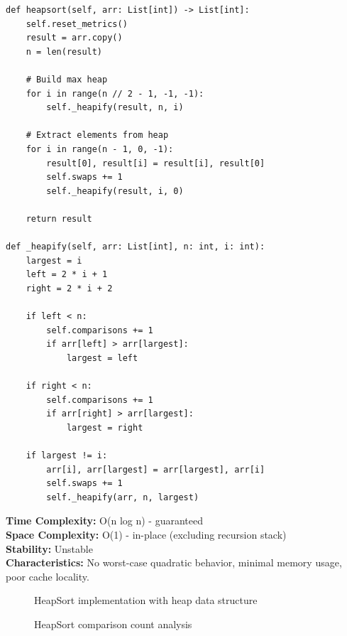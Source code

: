 \documentclass[12pt]{article}
\begin{document}
\begin{lstlisting}[caption={HeapSort Implementation}]
def heapsort(self, arr: List[int]) -> List[int]:
    self.reset_metrics()
    result = arr.copy()
    n = len(result)
    
    # Build max heap
    for i in range(n // 2 - 1, -1, -1):
        self._heapify(result, n, i)
    
    # Extract elements from heap
    for i in range(n - 1, 0, -1):
        result[0], result[i] = result[i], result[0]
        self.swaps += 1
        self._heapify(result, i, 0)
    
    return result

def _heapify(self, arr: List[int], n: int, i: int):
    largest = i
    left = 2 * i + 1
    right = 2 * i + 2
    
    if left < n:
        self.comparisons += 1
        if arr[left] > arr[largest]:
            largest = left
    
    if right < n:
        self.comparisons += 1
        if arr[right] > arr[largest]:
            largest = right
    
    if largest != i:
        arr[i], arr[largest] = arr[largest], arr[i]
        self.swaps += 1
        self._heapify(arr, n, largest)
\end{lstlisting}

\textbf{Time Complexity:} O(n log n) - guaranteed \\
\textbf{Space Complexity:} O(1) - in-place (excluding recursion stack) \\
\textbf{Stability:} Unstable \\
\textbf{Characteristics:} No worst-case quadratic behavior, minimal memory usage, poor cache locality.

\begin{figure}[H]
    \centering
    \caption{HeapSort implementation with heap data structure}
    \label{fig:heapsort_impl}
\end{figure}

\begin{figure}[H]
    \centering
    \caption{HeapSort comparison count analysis}
    \label{fig:heapsort_comparisons}
\end{figure}
\end{document}
